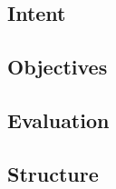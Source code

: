 \documentclass[dissertation.tex]{subfiles}
\begin{document}
\subsection{Intent}

\subsection{Objectives}

\subsection{Evaluation}

\subsection{Structure}

\clearpage
\end{document}
